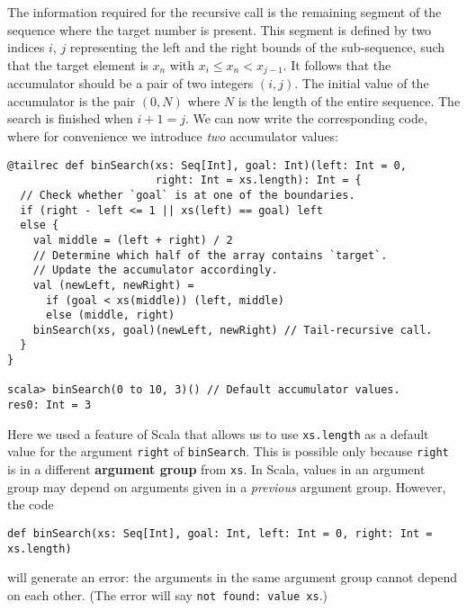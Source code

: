 The information required for the recursive call is the remaining segment
of the sequence where the target number is present. This segment is
defined by two indices $i$, $j$ representing the left and the right
bounds of the sub-sequence, such that the target element is $x_{n}$
with $x_{i}\leq x_{n}<x_{j-1}$. It follows that the accumulator should
be a pair of two integers $\left(i,j\right)$. The initial value of
the accumulator is the pair $\left(0,N\right)$ where $N$ is the
length of the entire sequence. The search is finished when $i+1=j$.
We can now write the corresponding code, where for convenience we
introduce \emph{two} accumulator values:
\begin{lstlisting}
@tailrec def binSearch(xs: Seq[Int], goal: Int)(left: Int = 0,
                       right: Int = xs.length): Int = {
  // Check whether `goal` is at one of the boundaries.
  if (right - left <= 1 || xs(left) == goal) left
  else {
    val middle = (left + right) / 2
    // Determine which half of the array contains `target`.
    // Update the accumulator accordingly.
    val (newLeft, newRight) =
      if (goal < xs(middle)) (left, middle)
      else (middle, right)
    binSearch(xs, goal)(newLeft, newRight) // Tail-recursive call.
  }
}

scala> binSearch(0 to 10, 3)() // Default accumulator values.
res0: Int = 3
\end{lstlisting}
Here we used a feature of Scala that allows us to use \lstinline!xs.length!
as a default value for the argument \lstinline!right!
of \lstinline!binSearch!.
This is possible only because \lstinline!right!
is in a different \textbf{argument group} from
\lstinline!xs!. In Scala,
values in an argument group may depend on arguments given in a \emph{previous}
argument group. However, the code
\begin{lstlisting}
def binSearch(xs: Seq[Int], goal: Int, left: Int = 0, right: Int = xs.length)
\end{lstlisting}
will generate an error: the arguments in the same argument group cannot
depend on each other. (The error will say \lstinline!not found: value xs!.)

